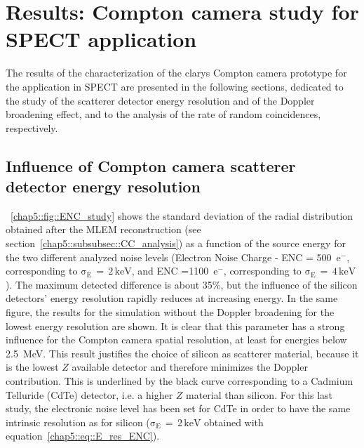 \section{Results: Compton camera study for SPECT application}\label{chap5::sec::Results_CC_SPECT}
The results of the characterization of the \gls{clarys} Compton camera prototype for the application in SPECT are presented in the following sections, dedicated to the study of the scatterer detector energy resolution and of the Doppler broadening effect, and to the analysis of the rate of random coincidences, respectively.

\subsection{Influence of Compton camera scatterer detector energy resolution}\label{chap5::subsec::Results_CC_SPECT_ENC}
\figurename~\ref{chap5::fig::ENC_study} shows the standard deviation of the radial distribution obtained after the MLEM reconstruction (see section~\ref{chap5::subsubsec::CC_analysis}) as a function of the source energy for the two different analyzed noise levels (Electron Noise Charge - ENC = 500~e$^-$, corresponding to $\mathrm{\sigma_{E}\,=\,2\,keV}$, and ENC =1100~e$^-$, corresponding to $\mathrm{\sigma_{E}\,=\,4\,keV}$). The maximum detected difference is about 35\%, but the influence of the silicon detectors' energy resolution rapidly reduces at increasing energy. In the same figure, the results for the simulation without the Doppler broadening for the lowest energy resolution are shown. It is clear that this parameter has a strong influence for the Compton camera spatial resolution, at least for energies below 2.5~MeV. This result justifies the choice of silicon as scatterer material, because it is the lowest $Z$ available detector and therefore minimizes the Doppler contribution. This is underlined by the black curve corresponding to a Cadmium Telluride (CdTe) detector, i.e. a higher $Z$ material than silicon. For this last study, the electronic noise level has been set for CdTe in order to have the same intrinsic resolution as for silicon ($\mathrm{\sigma_{E}\,=\,2\,keV}$ obtained with equation~\ref{chap5::eq::E_res_ENC}).


